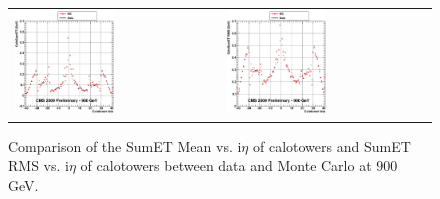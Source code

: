 \begin{figure}[h!]
 \centering
 \begin{tabular}{ll}
  \includegraphics[width=0.5\textwidth]{plots_DataVsMC_MB_900GeV/g_caloSumetMean_vs_ieta_900.eps} &
  \includegraphics[width=0.5\textwidth]{plots_DataVsMC_MB_900GeV/g_caloSumetRMS_vs_ieta_900.eps} \\
 \end{tabular}
 \caption{\small Comparison of the SumET Mean vs. i$\eta$ of calotowers and SumET RMS vs. i$\eta$ of calotowers between 
          data and Monte Carlo at $900$ GeV.\label{fig:SumET_MeanRMS_vs_ieta_900}}
\end{figure}

